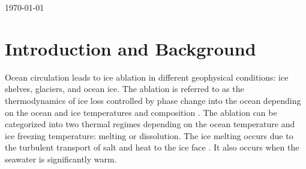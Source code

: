 \documentclass[11pt,a4paper]{article}
\begin{document}
\begin{titlepage}
	
	\vfill\vfill\vfill %
	
	{\large\today} %
	
	
	 
	
	\vfill %
	
    \end{titlepage}
	
	\section{Introduction and  Background}
	
	
	Ocean circulation leads to ice ablation in different geophysical conditions: ice shelves, glaciers, and ocean ice. The ablation is referred to as the thermodynamics of ice loss controlled by phase change into the ocean depending on the ocean and ice temperatures and composition \citep{malyarenko2020synthesis}. The ablation can be categorized into two thermal regimes depending on the ocean temperature and ice freezing temperature: melting or dissolution. The ice melting occurs due to the turbulent transport of salt and heat to the ice face \citep{gayen2016simulation}. It also occurs when the seawater is significantly warm.
	
\end{document}
